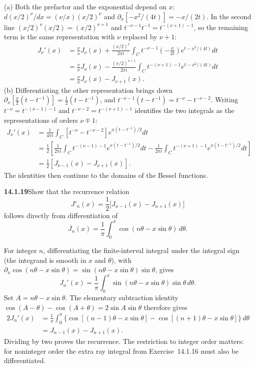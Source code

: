 (a) Both the prefactor and the exponential depend on $x$:
$d(x/2)^\nu/dx=(\nu/x)(x/2)^\nu$ and
$\partial_x[-x^2/(4t)]=-x/(2t)$. In the second line
$(x/2)^\nu(x/2)=(x/2)^{\nu+1}$ and $t^{-\nu-1}t^{-1}=t^{-(\nu+1)-1}$,
so the remaining term is the same representation with $\nu$ replaced
by $\nu+1$:
\begin{align*}
J_\nu'(x)
&=\frac\nu xJ_\nu(x)
 +\frac{(x/2)^\nu}{2\pi i}
 \int_C t^{-\nu-1}\left(-\frac{x}{2t}\right)
 e^{t-x^2/(4t)}dt\\
&=\frac\nu xJ_\nu(x)
 -\frac{(x/2)^{\nu+1}}{2\pi i}
 \int_C t^{-(\nu+1)-1}e^{t-x^2/(4t)}dt\\
&=\boxed{\frac\nu xJ_\nu(x)-J_{\nu+1}(x)}.
\end{align*}
(b) Differentiating the other representation brings down
$\partial_x[\frac x2(t-t^{-1})]=\frac12(t-t^{-1})$, and
$t^{-\nu-1}(t-t^{-1})=t^{-\nu}-t^{-\nu-2}$. Writing
$t^{-\nu}=t^{-(\nu-1)-1}$ and $t^{-\nu-2}=t^{-(\nu+1)-1}$ identifies
the two integrals as the representations of orders $\nu\mp1$:
\begin{align*}
J_\nu'(x)
&=\frac1{4\pi i}\int_C
 \left[t^{-\nu}-t^{-\nu-2}\right]e^{x(t-t^{-1})/2}dt\\
&=\frac12\left[\frac1{2\pi i}\int_C
 t^{-(\nu-1)-1}e^{x(t-t^{-1})/2}dt
-\frac1{2\pi i}\int_C t^{-(\nu+1)-1}e^{x(t-t^{-1})/2}dt\right]\\
&=\boxed{\tfrac12[J_{\nu-1}(x)-J_{\nu+1}(x)]}.
\end{align*}
The identities then continue to the domains of the Bessel functions.

\par\bigskip
\noindent\textbf{14.1.19}\quad Show that the recurrence relation
\[
J'_{n}(x)=\frac{1}{2}\big[J_{n-1}(x)-J_{n+1}(x)\big]
\]
follows directly from differentiation of
\[
J_{n}(x)=\frac{1}{\pi}\int_{0}^{\pi}\cos(n\theta-x\sin\theta)\,d\theta.
\]
\par{}
\solution
For integer $n$, differentiating the finite-interval integral under
the integral sign (the integrand is smooth in $x$ and $\theta$), with
$\partial_x\cos(n\theta-x\sin\theta)=\sin(n\theta-x\sin\theta)\sin\theta$,
gives
\[
J_n'(x)=\frac1\pi\int_0^\pi
\sin(n\theta-x\sin\theta)\sin\theta\,d\theta.
\]
Set $A=n\theta-x\sin\theta$. The elementary subtraction identity
$\cos(A-\theta)-\cos(A+\theta)=2\sin A\sin\theta$ therefore gives
\begin{align*}
2J_n'(x)
&=\frac1\pi\int_0^\pi
\{\cos[(n-1)\theta-x\sin\theta]
-\cos[(n+1)\theta-x\sin\theta]\}\,d\theta\\
&=J_{n-1}(x)-J_{n+1}(x).
\end{align*}
Dividing by two proves the recurrence. The restriction to integer
order matters: for noninteger order the extra ray integral from
Exercise~14.1.16 must also be differentiated.

